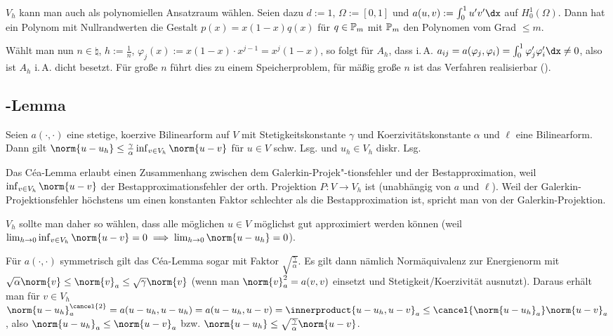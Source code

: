 \linie

\begin{Bsp}
    $V_h$ kann man auch als polynomiellen Ansatzraum wählen.
    Seien dazu $d := 1$, $\Omega := [0, 1]$ und
    $a(u, v) := \int_0^1 u'v' \dx$ auf $H^1_0(\Omega)$.
    Dann hat ein Polynom mit Nullrandwerten die Gestalt $p(x) = x(1-x)q(x)$ für $q \in \mathbb{P}_m$
    mit $\mathbb{P}_m$ den Polynomen vom Grad $\le m$.

    Wählt man nun $n \in \natural$, $h := \frac{1}{n}$,
    $\varphi_j(x) := x(1-x) \cdot x^{j-1} = x^j (1-x)$, so folgt für $A_h$, dass i.\,A.
    $a_{ij} = a(\varphi_j, \varphi_i) = \int_0^1 \varphi_j' \varphi_i' \dx \not= 0$,
    also ist $A_h$ i.\,A. dicht besetzt.
    Für große $n$ führt dies zu einem Speicherproblem,
    für mäßig große $n$ ist das Verfahren realisierbar ().
\end{Bsp}

\subsection{%
    -Lemma%
}

\begin{Lemma}{}
    Seien $a(\cdot, \cdot)$ eine stetige, koerzive Bilinearform auf $V$ mit
    Stetigkeitskonstante $\gamma$ und Koerzivitätskonstante $\alpha$
    und $\ell$ eine Bilinearform.\\
    Dann gilt $\norm{u - u_h} \le \frac{\gamma}{\alpha} \inf_{v \in V_h} \norm{u - v}$
    für $u \in V$ schw. Lsg. und $u_h \in V_h$ diskr. Lsg.
\end{Lemma}

\linie

\begin{Bem}
    Das Céa-Lemma erlaubt einen Zusammenhang zwischen dem Galerkin-Projek"-tionsfehler und
    der Bestapproximation, weil $\inf_{v \in V_h} \norm{u - v}$ der Bestapproximationsfehler
    der orth. Projektion $P\colon V \to V_h$ ist (unabhängig von $a$ und $\ell$).
    Weil der Galerkin-Projektionsfehler höchstens um einen konstanten Faktor schlechter als
    die Bestapproximation ist, spricht man von  der Galerkin-Projektion.

    $V_h$ sollte man daher so wählen,
    dass alle möglichen $u \in V$ möglichst gut approximiert werden können
    (weil $\lim_{h \to 0} \inf_{v \in V_h} \norm{u - v} = 0 \implies
    \lim_{h \to 0} \norm{u - u_h} = 0$).

    Für $a(\cdot, \cdot)$ symmetrisch gilt das Céa-Lemma sogar mit Faktor
    $\sqrt{\frac{\gamma}{\alpha}}$.
    Es gilt dann nämlich Normäquivalenz zur Energienorm mit
    $\sqrt{\alpha} \norm{v} \le \norm{v}_a \le \sqrt{\gamma} \norm{v}$
    (wenn man $\norm{v}_a^2 = a(v, v)$ einsetzt und Stetigkeit/Koerzivität ausnutzt).
    Daraus erhält man für $v \in V_h$\\
    $\norm{u - u_h}_a^{\cancel{2}} = a(u - u_h, u - u_h) = a(u - u_h, u - v) =
    \innerproduct{u - u_h, u - v}_a \le \cancel{\norm{u - u_h}_a} \norm{u - v}_a$,
    also $\norm{u - u_h}_a \le \norm{u - v}_a$ bzw.
    $\norm{u - u_h} \le \sqrt{\frac{\gamma}{\alpha}} \norm{u - v}$.
\end{Bem}

